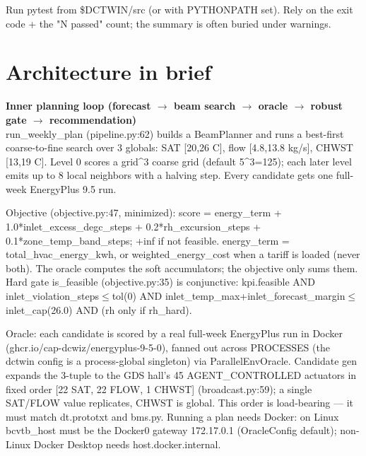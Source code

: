 \documentclass[10pt]{article}
\begin{document}
Run pytest from \$DCTWIN/\allowbreak{}src (or with PYTHONPATH set). Rely on the exit code + the "N passed" count; the summary is often buried under warnings.


\section*{Architecture in brief}
\smallskip\noindent\textbf{Inner planning loop (forecast $\rightarrow$ beam search $\rightarrow$ oracle $\rightarrow$ robust gate $\rightarrow$ recommendation)}\\[1pt]
run\_\allowbreak{}weekly\_\allowbreak{}plan (pipeline.py:62) builds a BeamPlanner and runs a best-first coarse-to-fine search over 3 globals: SAT [20,26 C], flow [4.8,13.8 kg/\allowbreak{}s], CHWST [13,19 C]. Level 0 scores a grid\textasciicircum{}3 coarse grid (default 5\textasciicircum{}3=125); each later level emits up to 8 local neighbors with a halving step. Every candidate gets one full-week EnergyPlus 9.5 run.

Objective (objective.py:47, minimized): score = energy\_\allowbreak{}term + 1.0*inlet\_\allowbreak{}excess\_\allowbreak{}degc\_\allowbreak{}steps + 0.2*rh\_\allowbreak{}excursion\_\allowbreak{}steps + 0.1*zone\_\allowbreak{}temp\_\allowbreak{}band\_\allowbreak{}steps; +inf if not feasible. energy\_\allowbreak{}term = total\_\allowbreak{}hvac\_\allowbreak{}energy\_\allowbreak{}kwh, or weighted\_\allowbreak{}energy\_\allowbreak{}cost when a tariff is loaded (never both). The oracle computes the soft accumulators; the objective only sums them. Hard gate is\_\allowbreak{}feasible (objective.py:35) is conjunctive: kpi.feasible AND inlet\_\allowbreak{}violation\_\allowbreak{}steps$\leq$tol(0) AND inlet\_\allowbreak{}temp\_\allowbreak{}max+inlet\_\allowbreak{}forecast\_\allowbreak{}margin$\leq$inlet\_\allowbreak{}cap(26.0) AND (rh only if rh\_\allowbreak{}hard).

Oracle: each candidate is scored by a real full-week EnergyPlus run in Docker (ghcr.io/\allowbreak{}cap-dcwiz/\allowbreak{}energyplus-9-5-0), fanned out across PROCESSES (the dctwin config is a process-global singleton) via ParallelEnvOracle. Candidate gen expands the 3-tuple to the GDS hall's 45 AGENT\_\allowbreak{}CONTROLLED actuators in fixed order [22 SAT, 22 FLOW, 1 CHWST] (broadcast.py:59); a single SAT/\allowbreak{}FLOW value replicates, CHWST is global. This order is load-bearing — it must match dt.prototxt and bms.py. Running a plan needs Docker: on Linux bcvtb\_\allowbreak{}host must be the Docker0 gateway 172.17.0.1 (OracleConfig default); non-Linux Docker Desktop needs host.docker.internal.
\end{document}
